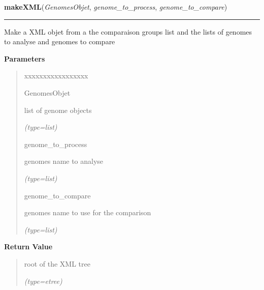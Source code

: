 \hspace{.8\funcindent}\begin{boxedminipage}{\funcwidth}

    \raggedright \textbf{makeXML}(\textit{GenomesObjet}, \textit{genome\_to\_process}, \textit{genome\_to\_compare})

    \vspace{-1.5ex}

    \rule{\textwidth}{0.5\fboxrule}
\setlength{\parskip}{2ex}
    Make a XML objet from a the comparaison groups list and the lists of 
    genomes to analyse and genomes to compare

\setlength{\parskip}{1ex}
      \textbf{Parameters}
      \vspace{-1ex}

      \begin{quote}
        \begin{Ventry}{xxxxxxxxxxxxxxxxx}

          \item[GenomesObjet]

          list of genome objects

            {\it (type=list)}

          \item[genome\_to\_process]

          genomes name to analyse

            {\it (type=list)}

          \item[genome\_to\_compare]

          genomes name to use for the comparison

            {\it (type=list)}

        \end{Ventry}

      \end{quote}

      \textbf{Return Value}
    \vspace{-1ex}

      \begin{quote}
      root of the XML tree

      {\it (type=etree)}

      \end{quote}

    \end{boxedminipage}

    \label{script-FixedVar:main}

